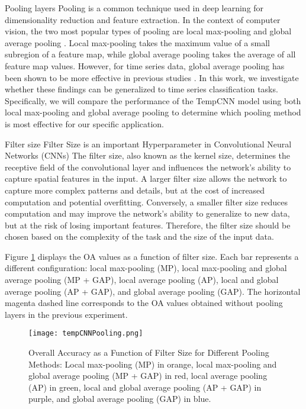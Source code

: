 \begin{paragraph}{Pooling layers}
Pooling is a common technique used in deep learning for dimensionality reduction and feature extraction.
In the context of computer vision, the two most popular types of pooling are local max-pooling \cite{Ren2015Faster} and global average pooling \cite{He2016Deep}.
Local max-pooling takes the maximum value of a small subregion of a feature map, while global average pooling takes the average of all feature map values.
However, for time series data, global average pooling has been shown to be more effective in previous studies \cite{rs10020236,fawaz2018deep}.
In this work, we investigate whether these findings can be generalized to time series classification tasks. 
Specifically, we will compare the performance of the TempCNN model using both local max-pooling and global average pooling to determine which pooling method is most effective for our specific application.
\end{paragraph}

\begin{paragraph}{Filter size}
Filter Size is an important Hyperparameter in Convolutional Neural Networks (CNNs)
The filter size, also known as the kernel size, determines the receptive field of the convolutional layer and influences the network's ability to capture spatial features in the input.
A larger filter size allows the network to capture more complex patterns and details, but at the cost of increased computation and potential overfitting.
Conversely, a smaller filter size reduces computation and may improve the network's ability to generalize to new data, but at the risk of losing important features.
Therefore, the filter size should be chosen based on the complexity of the task and the size of the input data.
\end{paragraph}



Figure \ref{tab:tempCNNPooling} displays the OA values as a function of filter size. 
Each bar represents a different configuration: local max-pooling (MP), local max-pooling and global average pooling (MP + GAP), local average pooling (AP), local and global average pooling (AP + GAP), and global average pooling (GAP). 
The horizontal magenta dashed line corresponds to the OA values obtained without pooling layers in the previous experiment.


\begin{figure}[H]
  \centering
  \texttt{[image: tempCNNPooling.png]}
  \caption{Overall Accuracy as a Function of Filter Size for Different Pooling Methods: Local max-pooling (MP) in orange, local max-pooling and global average pooling (MP + GAP) in red, local average pooling (AP) in green, local and global average pooling (AP + GAP) in purple, and global average pooling (GAP) in blue.}
  \label{tab:tempCNNPooling}
\end{figure}

